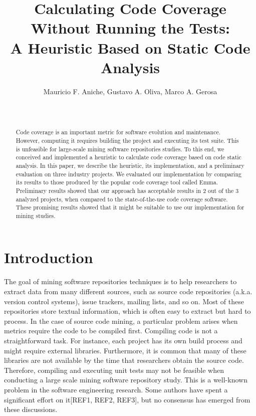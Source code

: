 \documentclass{sig-alternate}
\begin{document}

\title{Calculating Code Coverage Without Running the Tests:\\
A Heuristic Based on Static Code Analysis}

\author{
\alignauthor
Mauricio F. Aniche, Gustavo A. Oliva, Marco A. Gerosa\\
\\
\\
}

\maketitle
\begin{abstract}

Code coverage is an important metric for software evolution and maintenance.
However, computing it requires building the project and executing its test suite.
This is unfeasible for large-scale mining software repositories studies. To this end,
we conceived and implemented a heuristic to calculate code coverage based on 
code static analysis. In this paper, we describe the heuristic, its implementation, 
and a preliminary evaluation on three industry projects. We evaluated our implementation by 
comparing its results to those produced by the popular code coverage tool called Emma. 
Preliminary results showed that our approach has acceptable results in 2 out of 
the 3 analyzed projects, when compared to the state-of-the-use code coverage software.
These promising results showed that it might be suitable to use our implementation for mining studies.

\end{abstract}

\section{Introduction}
\label{sec:intro}

The goal of mining software repositories techniques is to help
researchers to extract data from many different sources, 
such as source code repositories (a.k.a. version control systems), 
issue trackers, mailing lists, and so on. Most of these repositories 
store textual information, which is often easy to extract but hard to process. 
In the case of source code mining, a particular problem arises when metrics 
require the code to be compiled first. Compiling code is not a straightforward task. 
For instance, each project has its own build process and might require external libraries. Furthermore, 
it is common that many of these libraries are not available by the time 
that researchers obtain the source code. Therefore, compiling and executing 
unit tests may not be feasible when conducting a large scale mining software repository study.
This is a well-known problem in the software engineering research. 
Some authors have spent a significant effort on it[REF1, REF2, REF3], 
but no consensus has emerged from these discussions.
\end{document}
